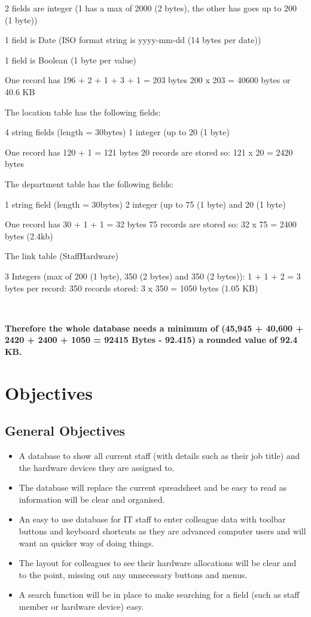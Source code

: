 2 fields are integer (1 has a max of 2000 (2 bytes), the other has goes up to 200 (1 byte))

1 field is Date (ISO format string is yyyy-mm-dd (14 bytes per date))

1 field is Boolean (1 byte per value)

One record has 196 + 2 + 1 + 3 + 1 = 203 bytes
200 x 203 = 40600 bytes or 40.6 KB

The location table has the following fields:

4 string fields (length = 30bytes)
1 integer (up to 20 (1 byte)

One record has 120 + 1 = 121 bytes
20 records are stored so:
121 x 20 = 2420 bytes

The department table has the following fields:

1 string field (length = 30bytes)
2 integer (up to 75 (1 byte) and 20 (1 byte)

One record has 30 + 1 + 1 = 32 bytes
75 records are stored so:
32 x 75 = 2400 bytes (2.4kb)

The link table (StaffHardware)

3 Integers (max of 200 (1 byte), 350 (2 bytes) and 350 (2 bytes)):
1 + 1 + 2 = 3 bytes per record:
350 records stored:
3 x 350 = 1050 bytes (1.05 KB)

\

\textbf{Therefore the whole database needs a minimum of (45,945 + 40,600 + 2420 + 2400 + 1050 = 92415 Bytes - 92.415) a rounded value of 92.4 KB.}


\section{Objectives}

\subsection{General Objectives}

\begin{itemize}
\item A database to show all current staff (with details such as their job title) and the hardware devices they are assigned to.
\item The database will replace the current spreadsheet and be easy to read as information will be clear and organised.
\item An easy to use database for IT staff to enter colleague data with toolbar buttons and keyboard shortcuts as they are advanced computer users and will want an quicker way of doing things.
\item The layout for colleagues to see their hardware allocations will be clear and to the point, missing out any unnecessary buttons and menus.
\item A search function will be in place to make searching for a field (such as staff member or hardware device) easy.
\end{itemize}

